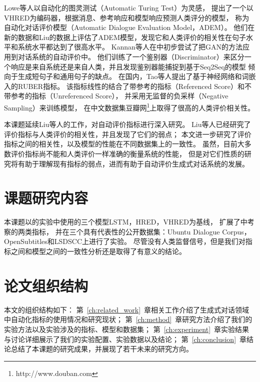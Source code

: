 Lowe等人以自动化的图灵测试（Automatic Turing Test）为灵感，
提出了一个以VHRED为编码器，根据消息、参考响应和模型响应预测人类评分的模型，
称为自动化对话评价模型（Automatic Dialogue Evaluation Model，ADEM）。
他们在新的数据和Liu的数据上评估了ADEM模型，发现它和人类评价的相关性在句子水平和系统水平都达到了很高水平。
Kannan等人在\cite{DBLP:journals/corr/KannanV17}中初步尝试了把GAN的方法应用到对话系统的自动评价中。
他们训练了一个鉴别器（Discriminator）来区分一个响应是来自系统还是来自人类，并且发现鉴别器能捕捉到基于Seq2Seq的模型
倾向于生成短句子和通用句子的缺点。
在国内，Tao等人提出了基于神经网络和词嵌入的RUBER指标。
该指标线性的结合了带参考的指标（Referenced Score）和不带参考的指标（Unreferenced Score），
并采用无监督的负采样（Negative Sampling）来训练模型，
在中文数据集豆瓣网\footnote{http://www.douban.com}上取得了很高的人类评价相关性。 %

本课题延续Liu等人的工作，对自动评价指标进行深入研究。
Liu等人已经研究了评价指标与人类评价的相关性，并且发现了它们的弱点；
本文进一步研究了评价指标之间的相关性，以及模型的性能在不同数据集上的一致性。
虽然，目前大多数评价指标尚不能和人类评价一样准确的衡量系统的性能，
但是对它们性质的研究将有助于理解现有指标的弱点，进而有助于自动评价生成式对话系统的发展。

\section{课题研究内容}\label{sec:reseach_content}
本课题以\cite{DBLP:journals/corr/SerbanSLCPCB16}的实验中使用的三个模型LSTM，HRED，VHRED为基线，
扩展了\cite{DBLP:conf/emnlp/LiuLSNCP16}中考察的两类指标，
并在三个具有代表性的公开数据集：Ubuntu Dialogue Corpus，OpenSubtitles和LSDSCC上进行了实验。
尽管没有人类监督信号，但是我们对指标之间和模型之间的一致性分析还是取得了有意义的结论。

\section{论文组织结构}\label{sec:paper_organization}
本文的组织结构如下：
第~\ref{ch:related_work}~章相关工作介绍了生成式对话领域中自动化指标的使用情况和研究现状；
第~\ref{ch:method}~章研究方法介绍了我们的实验方法以及实验涉及的指标、模型和数据集；
第~\ref{ch:experiment}~章实验结果与讨论详细展示了我们的实验配置、实验数据以及结论；
第~\ref{ch:conclusion}~章结论总结了本课题的研究成果，并展现了若干未来的研究方向。
